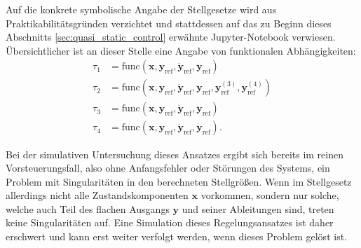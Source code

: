 Auf die konkrete symbolische Angabe der Stellgesetze wird aus Praktikabilitätsgründen verzichtet und stattdessen auf das zu Beginn dieses Abschnitts \ref{sec:quasi_static_control} erwähnte Jupyter-Notebook verwiesen. Übersichtlicher ist an dieser Stelle eine Angabe von funktionalen Abhängigkeiten:
\begin{subequations}
	\begin{align}
		\tau_1 &= \mathrm{func}(\mathbf{x}, \mathbf{y}_{\mathrm{ref}}, \dot{\mathbf{y}}_{\mathrm{ref}}, \ddot{\mathbf{y}}_{\mathrm{ref}}) \\
		\tau_2 &= \mathrm{func}(\mathbf{x}, \mathbf{y}_{\mathrm{ref}}, \dot{\mathbf{y}}_{\mathrm{ref}}, \ddot{\mathbf{y}}_{\mathrm{ref}}, \mathbf{y}_{\mathrm{ref}}^{(3)}, \mathbf{y}_{\mathrm{ref}}^{(4)}) \\
		\tau_3 &=\mathrm{func}(\mathbf{x}, \mathbf{y}_{\mathrm{ref}}, \dot{\mathbf{y}}_{\mathrm{ref}}, \ddot{\mathbf{y}}_{\mathrm{ref}}) \\
		\tau_4 &= \mathrm{func}(\mathbf{x}, \mathbf{y}_{\mathrm{ref}}, \dot{\mathbf{y}}_{\mathrm{ref}}, \ddot{\mathbf{y}}_{\mathrm{ref}}).
	\end{align}
\end{subequations}

Bei der simulativen Untersuchung dieses Ansatzes ergibt sich bereits im reinen Vorsteuerungsfall, also ohne Anfangsfehler oder Störungen des Systems, ein Problem mit Singularitäten in den berechneten Stellgrößen. Wenn im Stellgesetz allerdings nicht alle Zustandskomponenten $\mathbf{x}$ vorkommen, sondern nur solche, welche auch Teil des flachen Ausgangs $\mathbf{y}$ und seiner Ableitungen sind, treten keine Singularitäten auf. Eine Simulation dieses Regelungsansatzes ist daher erschwert und kann erst weiter verfolgt werden, wenn dieses Problem gelöst ist.

